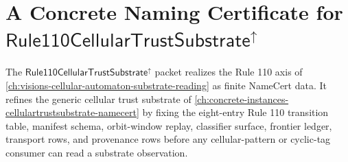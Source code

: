 \chapter{A Concrete Naming Certificate for $\mathsf{Rule110CellularTrustSubstrate}^{\uparrow}$}
\label{ch:concrete-instances-rule110-cellular-trust-substrate-namecert}

The $\mathsf{Rule110CellularTrustSubstrate}^{\uparrow}$ packet realizes the Rule 110 axis of \autoref{ch:visions-cellular-automaton-substrate-reading} as finite NameCert data. It refines the generic cellular trust substrate of \autoref{ch:concrete-instances-cellulartrustsubstrate-namecert} by fixing the eight-entry Rule 110 transition table, manifest schema, orbit-window replay, classifier surface, frontier ledger, transport rows, and provenance rows before any cellular-pattern or cyclic-tag consumer can read a substrate observation.

